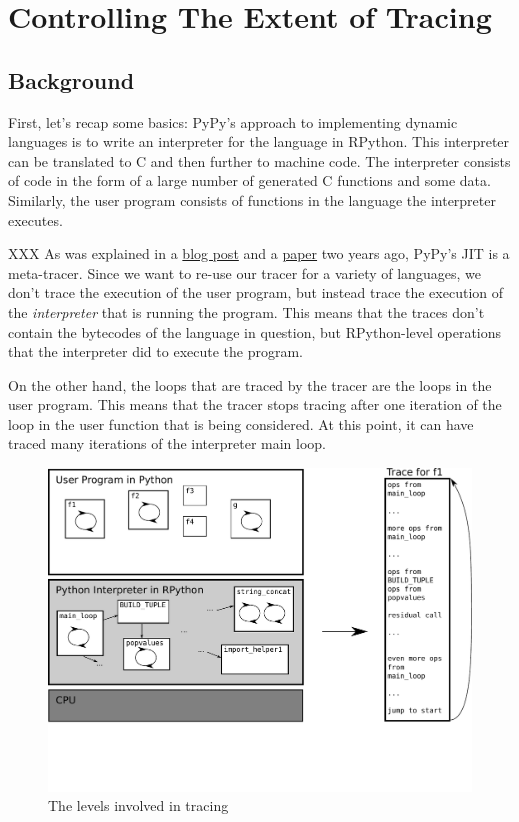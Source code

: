 \documentclass{sig-alternate}
\begin{document}
\section{Controlling The Extent of Tracing}


\subsection{Background}

First, let's recap some basics: PyPy's approach to implementing dynamic
languages is to write an interpreter for
the language in RPython. This interpreter can be translated to C and then
further to machine code. The interpreter consists of code in the form of a
large number of generated C functions and some data. Similarly, the user
program consists of functions in the language the interpreter executes.

XXX As was explained in a \href{http://morepypy.blogspot.com/2009/03/applying-tracing-jit-to-interpreter.html}{blog post} and a \href{http://codespeak.net/svn/pypy/extradoc/talk/icooolps2009/bolz-tracing-jit.pdf}{paper} two years ago, PyPy's JIT is a
meta-tracer. Since we want to re-use our tracer for a variety of languages, we
don't trace the execution of the user program, but instead trace the execution
of the \emph{interpreter} that is running the program. This means that the traces
don't contain the bytecodes of the language in question, but RPython-level
operations that the interpreter did to execute the program.

On the other hand, the loops that are traced by the tracer are the loops in the
user program. This means that the tracer stops tracing after one iteration of
the loop in the user function that is being considered. At this point, it can
have traced many iterations of the interpreter main loop.

\begin{figure}
\includegraphics[scale=0.5]{figures/trace-levels}
\caption{The levels involved in tracing}
\label{fig:trace-levels}
\end{figure}
\end{document}
